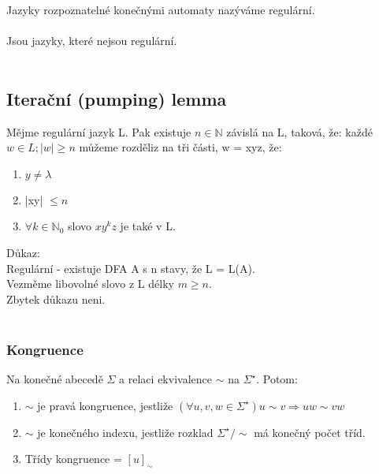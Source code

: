 \documentclass{article}
\begin{document}
Jazyky rozpoznatelné konečnými automaty nazýváme regulární.\\\\

Jsou jazyky, které nejsou regulární. \\\\

\subsection{Iterační (pumping) lemma}
Mějme regulární jazyk L. Pak existuje $n \in \mathbb{N}$ závislá na L, taková, že:
každé $w \in L; |w| \geq n$ můžeme rozděliz na tři části, w = xyz, že:\\
\begin{enumerate}
    \item $y \neq \lambda$
    \item |xy| $\leq n$
    \item $\forall k \in \mathbb{N}_{0}$ slovo $xy^{k}z$ je také v L.
\end{enumerate}
Důkaz:\\
Regulární - existuje DFA A s n stavy, že L = L(A).\\
Vezměme libovolné slovo z L délky $m \geq n$.\\
Zbytek důkazu neni.\\\\


\subsubsection*{Kongruence}
Na konečné abecedě $\Sigma$ a relaci ekvivalence $\sim$ na $\Sigma^{\star}$. Potom:
\begin{enumerate}
    \item $\sim$ je pravá kongruence, jestliže $(\forall u,v,w \in \Sigma^{\star})u \sim v \Rightarrow uw \sim vw$
    \item $\sim$ je konečného indexu, jestliže rozklad $\Sigma^{\star} / \sim$ má konečný počet tříd.
    \item Třídy kongruence = $[u]_{\sim}$
\end{enumerate}
\end{document}
